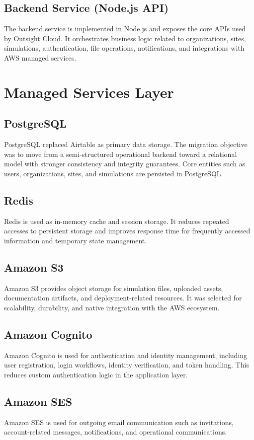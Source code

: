 \subsection{Backend Service (Node.js API)}
The backend service is implemented in Node.js and exposes the core APIs used by Outsight Cloud. It orchestrates business logic related to organizations, sites, simulations, authentication, file operations, notifications, and integrations with AWS managed services.

\section{Managed Services Layer}
\subsection{PostgreSQL}
PostgreSQL replaced Airtable as primary data storage. The migration objective was to move from a semi-structured operational backend toward a relational model with stronger consistency and integrity guarantees. Core entities such as users, organizations, sites, and simulations are persisted in PostgreSQL.

\subsection{Redis}
Redis is used as in-memory cache and session storage. It reduces repeated accesses to persistent storage and improves response time for frequently accessed information and temporary state management.

\subsection{Amazon S3}
Amazon S3 provides object storage for simulation files, uploaded assets, documentation artifacts, and deployment-related resources. It was selected for scalability, durability, and native integration with the AWS ecosystem.

\subsection{Amazon Cognito}
Amazon Cognito is used for authentication and identity management, including user registration, login workflows, identity verification, and token handling. This reduces custom authentication logic in the application layer.

\subsection{Amazon SES}
Amazon SES is used for outgoing email communication such as invitations, account-related messages, notifications, and operational communications.

